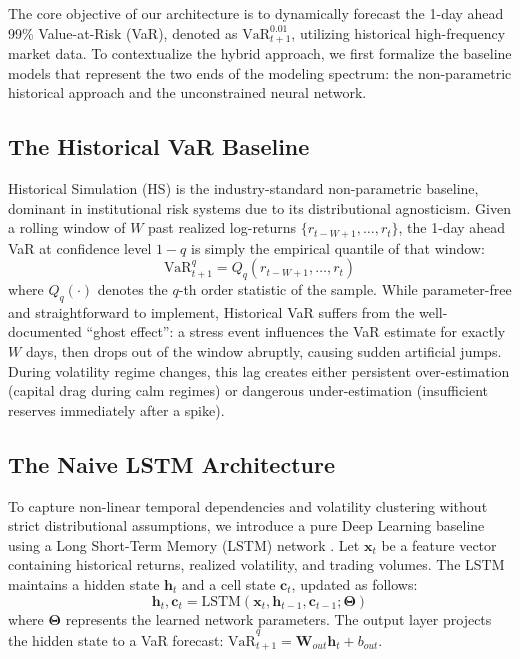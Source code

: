 
The core objective of our architecture is to dynamically forecast the 1-day ahead 99\% Value-at-Risk (VaR), denoted as $\text{VaR}_{t+1}^{0.01}$, utilizing historical high-frequency market data. To contextualize the hybrid approach, we first formalize the baseline models that represent the two ends of the modeling spectrum: the non-parametric historical approach and the unconstrained neural network.

\subsection{The Historical VaR Baseline}
Historical Simulation (HS) is the industry-standard non-parametric baseline, dominant in institutional risk systems due to its distributional agnosticism. Given a rolling window of $W$ past realized log-returns $\{r_{t-W+1}, \ldots, r_t\}$, the 1-day ahead VaR at confidence level $1 - q$ is simply the empirical quantile of that window:
\begin{equation}
    \text{VaR}_{t+1}^q = Q_q\!\left(r_{t-W+1}, \ldots, r_t\right)
\end{equation}
where $Q_q(\cdot)$ denotes the $q$-th order statistic of the sample. While parameter-free and straightforward to implement, Historical VaR suffers from the well-documented ``ghost effect'': a stress event influences the VaR estimate for exactly $W$ days, then drops out of the window abruptly, causing sudden artificial jumps. During volatility regime changes, this lag creates either persistent over-estimation (capital drag during calm regimes) or dangerous under-estimation (insufficient reserves immediately after a spike).

\subsection{The Naive LSTM Architecture}
To capture non-linear temporal dependencies and volatility clustering without strict distributional assumptions, we introduce a pure Deep Learning baseline using a Long Short-Term Memory (LSTM) network \cite{hochreiter1997long}. Let $\bm{x}_t$ be a feature vector containing historical returns, realized volatility, and trading volumes. The LSTM maintains a hidden state $\bm{h}_t$ and a cell state $\bm{c}_t$, updated as follows:
\begin{equation}
    \bm{h}_t, \bm{c}_t = \text{LSTM}(\bm{x}_t, \bm{h}_{t-1}, \bm{c}_{t-1}; \bm{\Theta})
\end{equation}
where $\bm{\Theta}$ represents the learned network parameters. The output layer projects the hidden state to a VaR forecast: $\widehat{\text{VaR}}_{t+1}^q = \bm{W}_{out} \bm{h}_t + b_{out}$.

